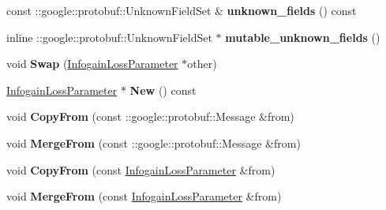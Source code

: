 \begin{DoxyCompactItemize}
const \+::google\+::protobuf\+::\+Unknown\+Field\+Set \& {\bfseries unknown\+\_\+fields} () const
\item 
\mbox{\label{classcaffe_1_1_infogain_loss_parameter_abdf5838ba83e2a4919b16318496589f6}} 
inline \+::google\+::protobuf\+::\+Unknown\+Field\+Set $\ast$ {\bfseries mutable\+\_\+unknown\+\_\+fields} ()
\item 
\mbox{\label{classcaffe_1_1_infogain_loss_parameter_a475c0894bd54f9adef9d7b07f949b254}} 
void {\bfseries Swap} (\mbox{\hyperlink{classcaffe_1_1_infogain_loss_parameter}{Infogain\+Loss\+Parameter}} $\ast$other)
\item 
\mbox{\label{classcaffe_1_1_infogain_loss_parameter_a1f37cd4388fe11616dd89eca0f70e1c0}} 
\mbox{\hyperlink{classcaffe_1_1_infogain_loss_parameter}{Infogain\+Loss\+Parameter}} $\ast$ {\bfseries New} () const
\item 
\mbox{\label{classcaffe_1_1_infogain_loss_parameter_ac49e2517ebff3c2aa70da0c55a29ef4d}} 
void {\bfseries Copy\+From} (const \+::google\+::protobuf\+::\+Message \&from)
\item 
\mbox{\label{classcaffe_1_1_infogain_loss_parameter_a81f7b0dfd357d307d30cfb6d3fbe54af}} 
void {\bfseries Merge\+From} (const \+::google\+::protobuf\+::\+Message \&from)
\item 
\mbox{\label{classcaffe_1_1_infogain_loss_parameter_aba00e513de9f00c30ede536cd5fd711a}} 
void {\bfseries Copy\+From} (const \mbox{\hyperlink{classcaffe_1_1_infogain_loss_parameter}{Infogain\+Loss\+Parameter}} \&from)
\item 
\mbox{\label{classcaffe_1_1_infogain_loss_parameter_a629bbfda9afcf8019ce69d5d7e447617}} 
void {\bfseries Merge\+From} (const \mbox{\hyperlink{classcaffe_1_1_infogain_loss_parameter}{Infogain\+Loss\+Parameter}} \&from)
\item 
\mbox{\label{classcaffe_1_1_infogain_loss_parameter_a9c0bd214d4202577c018d6085a7d6ad0}} 

\end{DoxyCompactItemize}

